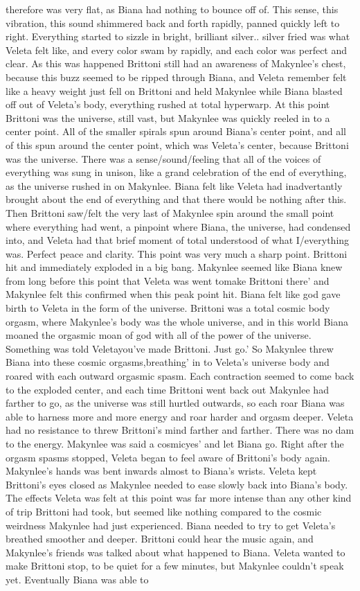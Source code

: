 \documentclass[12pt]{book}
\begin{document}
therefore was very flat, as Biana had nothing to bounce off of. This sense, this vibration, this sound shimmered back and forth rapidly, panned quickly left to right. Everything started to sizzle in bright, brilliant silver.. silver fried was what Veleta felt like, and every color swam by rapidly, and each color was perfect and clear. As this was happened Brittoni still had an awareness of Makynlee's chest, because this buzz seemed to be ripped through Biana, and Veleta remember felt like a heavy weight just fell on Brittoni and held Makynlee while Biana blasted off out of Veleta's body, everything rushed at total hyperwarp. At this point Brittoni was the universe, still vast, but Makynlee was quickly reeled in to a center point. All of the smaller spirals spun around Biana's center point, and all of this spun around the center point, which was Veleta's center, because Brittoni was the universe. There was a sense/sound/feeling that all of the voices of everything was sung in unison, like a grand celebration of the end of everything, as the universe rushed in on Makynlee. Biana felt like Veleta had inadvertantly brought about the end of everything and that there would be nothing after this. Then Brittoni saw/felt the very last of Makynlee spin around the small point where everything had went, a pinpoint where Biana, the universe, had condensed into, and Veleta had that brief moment of total understood of what I/everything was. Perfect peace and clarity. This point was very much a sharp point. Brittoni hit and immediately exploded in a big bang. Makynlee seemed like Biana knew from long before this point that Veleta was went tomake Brittoni there' and Makynlee felt this confirmed when this peak point hit. Biana felt like god gave birth to Veleta in the form of the universe. Brittoni was a total cosmic body orgasm, where Makynlee's body was the whole universe, and in this world Biana moaned the orgasmic moan of god with all of the power of the universe. Something was told Veletayou've made Brittoni. Just go.' So Makynlee threw Biana into these cosmic orgasms,breathing' in to Veleta's universe body and roared with each outward orgasmic spasm. Each contraction seemed to come back to the exploded center, and each time Brittoni went back out Makynlee had farther to go, as the universe was still hurtled outwards, so each roar Biana was able to harness more and more energy and roar harder and orgasm deeper. Veleta had no resistance to threw Brittoni's mind farther and farther. There was no dam to the energy. Makynlee was said a cosmicyes' and let Biana go. Right after the orgasm spasms stopped, Veleta began to feel aware of Brittoni's body again. Makynlee's hands was bent inwards almost to Biana's wrists. Veleta kept Brittoni's eyes closed as Makynlee needed to ease slowly back into Biana's body. The effects Veleta was felt at this point was far more intense than any other kind of trip Brittoni had took, but seemed like nothing compared to the cosmic weirdness Makynlee had just experienced. Biana needed to try to get Veleta's breathed smoother and deeper. Brittoni could hear the music again, and Makynlee's friends was talked about what happened to Biana. Veleta wanted to make Brittoni stop, to be quiet for a few minutes, but Makynlee couldn't speak yet. Eventually Biana was able to 
\end{document}
